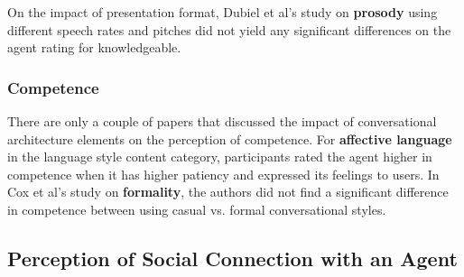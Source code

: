 \documentclass[sigconf,screen,review, anonymous]{acmart}
\newcommand{\cmt}[1]{}%
\begin{document}
%



On the impact of presentation format, Dubiel et al's study on \textbf{prosody} using different speech rates and pitches did not yield any significant differences on the agent rating for knowledgeable.

%



\subsubsection{Competence}

There are only a couple of papers that discussed the impact of conversational architecture elements on the perception of competence. For \textbf{affective language} in the language style content category, participants rated the agent higher in competence when it has higher patiency and expressed its feelings to users. In Cox et al's study on \textbf{formality}, the authors did not find a significant difference in competence between using casual vs. formal conversational styles.



%


\subsection{Perception of Social Connection with an Agent}
\end{document}

